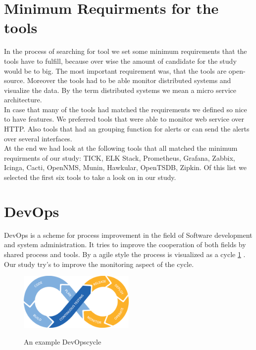 \section{Minimum Requirments for the tools}
In the process of searching for tool we set some minimum requirements that the tools have to fulfill, because over wise the amount of candidate for the study would be to big. The most important requirement was, that the tools are open-source. Moreover the tools had to be able monitor distributed systems and visualize the data. By the term distributed systems we  mean a micro service architecture. \\
In case that many of the tools had matched the requirements we defined so nice to have features. We preferred tools that were able to monitor web service over HTTP. Also tools that had an grouping function for alerts or can send the alerts over several interfaces. \\
At the end we had look at the following tools that all matched the minimum requirments of our study: TICK, ELK Stack, Prometheus, Grafana, Zabbix, Icinga, Cacti, OpenNMS, Munin, Hawkular, OpenTSDB, Zipkin. Of this list we selected the first six tools to take a look on in our study.   


\section{DevOps}
\label{devops}
DevOps is a scheme for process improvement in the field of Software development and system administration\cite{Bass:2015:DSA:2810087}. It tries to improve the cooperation of both fields by shared process and tools.
By a agile style the process is visualized as a cycle \cref{fig:devopscycle} . Our study try's to improve the monitoring aspect of the cycle.
\begin{figure}
	\centering
	\includegraphics[width=0.5\textwidth]{Bilder/devopscycle}
	\caption{An example DevOpscycle}
	\label{fig:devopscycle}
	\cite{Devops}
\end{figure}